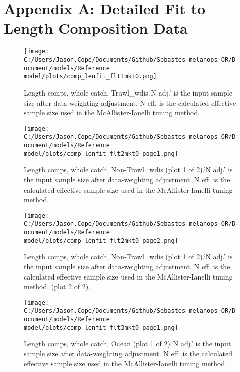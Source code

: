 \documentclass[11pt,
  english,
  letterpaper,
]{article}
\begin{document}
\clearpage

\hypertarget{app-a}{%
\section{Appendix A: Detailed Fit to Length Composition Data}\label{app-a}}

\begin{figure}
\centering
\texttt{[image: C:/Users/Jason.Cope/Documents/Github/Sebastes\_melanops\_OR/Document/models/Reference model/plots/comp\_lenfit\_flt1mkt0.png]}
\caption{Length comps, whole catch, Trawl\_wdis.`N adj.' is the input sample size after data-weighting adjustment. N eff. is the calculated effective sample size used in the McAllister-Ianelli tuning method.\label{fig:comp_lenfit_flt1mkt0}}
\end{figure}

\begin{figure}
\centering
\texttt{[image: C:/Users/Jason.Cope/Documents/Github/Sebastes\_melanops\_OR/Document/models/Reference model/plots/comp\_lenfit\_flt2mkt0\_page1.png]}
\caption{Length comps, whole catch, Non-Trawl\_wdis (plot 1 of 2).`N adj.' is the input sample size after data-weighting adjustment. N eff. is the calculated effective sample size used in the McAllister-Ianelli tuning method.\label{fig:comp_lenfit_flt2mkt0_page1}}
\end{figure}

\begin{figure}
\centering
\texttt{[image: C:/Users/Jason.Cope/Documents/Github/Sebastes\_melanops\_OR/Document/models/Reference model/plots/comp\_lenfit\_flt2mkt0\_page2.png]}
\caption{Length comps, whole catch, Non-Trawl\_wdis (plot 1 of 2).`N adj.' is the input sample size after data-weighting adjustment. N eff. is the calculated effective sample size used in the McAllister-Ianelli tuning method. (plot 2 of 2).\label{fig:comp_lenfit_flt2mkt0_page2}}
\end{figure}

\begin{figure}
\centering
\texttt{[image: C:/Users/Jason.Cope/Documents/Github/Sebastes\_melanops\_OR/Document/models/Reference model/plots/comp\_lenfit\_flt3mkt0\_page1.png]}
\caption{Length comps, whole catch, Ocean (plot 1 of 2).`N adj.' is the input sample size after data-weighting adjustment. N eff. is the calculated effective sample size used in the McAllister-Ianelli tuning method.\label{fig:comp_lenfit_flt3mkt0_page1}}
\end{figure}
\end{document}
